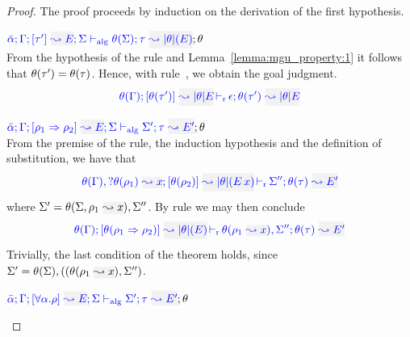 \begin{proof}
The proof proceeds by induction on the derivation of the first hypothesis.
\begin{description}
\setlength{\itemsep}{1em}
\item[\fbox{\rref{Alg-M-Simp}}]\quad
$\admress{\bar\alpha}{\tenv}{\type'}{E}{\Sigma}{\type}{\etrans\theta(E)}{\theta(\Sigma)}{\theta}$\ \\

From the hypothesis of the rule and Lemma~\ref{lemma:mgu_property:1} it follows that
$\theta(\tau') = \theta(\tau)$. Hence, with rule~, we obtain the goal judgment.
\begin{equation*}
  \dmres{\theta(\tenv)}{\theta(\type')}{\etrans\theta{E}}{\theta(\type')}{\etrans\theta{E}}{\epsilon}
\end{equation*}

\item[\fbox{\rref{Alg-M-IApp}}]\quad
$\admress{\bar\alpha}{\tenv}{\rulet_1\To\rulet_2}{E}{\Sigma}{\type}{E'}{\Sigma'}{\theta}$\ \\

  From the premise of the rule, the induction hypothesis and the definition of substitution,
we have that
\begin{equation*}
  \dmres{\theta(\tenv),\envi{\theta(\rulet_1)}{x}}{\theta(\rulet_2)}{\etrans\theta(\mmapp{E}{x})}{\theta(\type)}{E'}{\Sigma''}
\end{equation*}
where $\Sigma' = \theta(\Sigma,\ie{\rulet_1}{x}),\Sigma''$. By rule  we may then conclude
\begin{equation*}
\dmres{\theta(\tenv)}{\theta(\rulet_1\To\rulet_2)}{\etrans\theta(E)}{\theta(\type)}{E'}{\theta(\ie{\rulet_1}{x}),\Sigma''}
\end{equation*}
Trivially, the last condition of the theorem holds, since $\Sigma' = \theta(\Sigma),((\theta(\ie{\rulet_1}{x}),\Sigma'')$.\\

\item[\fbox{\rref{Alg-M-TApp}}]\quad
$\admress{\bar\alpha}{\tenv}{\tall{\alpha}{\rulet}}{E}{\Sigma}{\type}{E'}{\Sigma'}{\theta}$\ \\


\end{description}
\end{proof}
